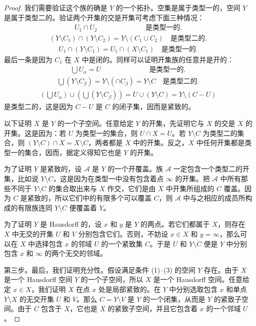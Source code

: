 \begin{proof}
我们需要验证这个族的确是 $Y$ 的一个拓扑。空集是属于类型一的，空间 $Y$ 是属于类型二的。验证两个开集的交是开集可考虑下面三种情况：
\begin{align*}
U_{1}\cap U_{2}\quad\qquad\qquad\qquad\text{是类型一的.}
\end{align*}
\begin{align*}
(Y\setminus C_{1})\cap(Y\setminus C_{2})=Y\setminus(C_{1}\cup C_{2})\quad\text{是类型二的.}
\end{align*}
\begin{align*}
U_{1}\cap(Y\setminus C_{1})=U_{1}\cap(X\setminus C_{1})\quad\text{是类型一的.}
\end{align*}
最后一条是因为 $C_{1}$ 在 $X$ 中是闭的。同样可以证明开集族的任意并是开的：
\begin{align*}
\bigcup U_{\alpha}=U\quad\qquad\qquad\qquad\text{是类型一的.}
\end{align*}
\begin{align*}
\bigcup(Y\setminus C_{\beta})=Y\setminus(\cap C_{\beta})=Y\setminus C\quad\text{是类型二的.}
\end{align*}
\begin{align*}
(\bigcup U_{\alpha})\cup(\bigcup(Y\setminus C_{\beta}))=U\cup(Y\setminus C)=Y\setminus(C-U)
\end{align*}
是类型二的，这是因为 $C-U$ 是 $C$ 的闭子集，因而是紧致的。

以下证明 $X$ 是 $Y$ 的一个子空间。任意给定 $Y$ 的开集，先证明它与 $X$ 的交是 $X$ 的开集。这是因为：若 $U$ 为类型一的集合，则 $U\cap X=U$。若 $Y\setminus C$ 为类型二的集合，则 $(Y\setminus C)\cap X=X\setminus C$，两者都是 $X$ 中的开集。反之，$X$ 中任何开集都是类型一的集合，因而，据定义得知它也是 $Y$ 的开集。

为了证明 $Y$ 是紧致的，设 $\mathcal{A}$ 是 $Y$ 的一个开覆盖。族 $\mathcal{A}$ 一定包含一个类型二的开集，比如说 $Y\setminus C$，这是因为在类型一中没有包含着点 $\infty$ 的开集。把 $\mathcal{A}$ 中所有那些不同于 $Y\setminus C$ 的集合取出来与 $X$ 作交，它们是由 $X$ 中开集所组成的 $C$ 覆盖。因为 $C$ 是紧致的，所以它们中的有限多个可以覆盖 $C$，则 $\mathcal{A}$ 中与之相应的成员所构成的有限族连同 $Y\setminus C$ 便覆盖着 $Y$。

为了证明 $Y$ 是 Hausdorff 的，设 $x$ 和 $y$ 是 $Y$ 的两点。若它们都属于 $X$，则存在 $X$ 中无交的开集 $U$ 和 $V$ 分别包含它们。否则，不妨设 $x\in X$ 和 $y=\infty$，那么可以在 $X$ 中选择包含 $x$ 的邻域 $U$ 的一个紧致集 $C$。于是 $U$ 和 $Y\setminus C$ 便是 $Y$ 中分别包含 $x$ 和 $\infty$ 的两个无交的邻域。

第三步。最后，我们证明充分性。假设满足条件 (1)--(3) 的空间 $Y$ 存在。由于 $X$ 是一个 Hausdorff 空间 $Y$ 的一个子空间，所以 $X$ 是一个 Hausdorff 空间。任意给定 $x\in X$，我们证明 $X$ 在点 $x$ 处是局部紧致的。在 $Y$ 中分别选取包含 $x$ 和单点 $Y\setminus X$ 的无交开集 $U$ 和 $V$。那么 $C=Y\setminus V$ 是 $Y$ 的一个闭集，从而是 $Y$ 的紧致子空间。由于 $C$ 包含于 $X$，它也是 $X$ 的紧致子空间，并且它包含着 $x$ 的一个邻域 $U$。
\end{proof}

